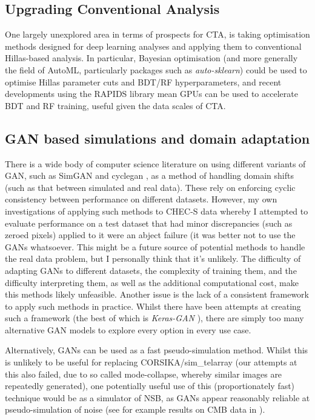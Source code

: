 \subsection{Upgrading Conventional Analysis}
One largely unexplored area in terms of prospects for CTA, is taking optimisation methods designed for deep learning analyses and applying them to conventional Hillas-based analysis. In particular, Bayesian optimisation (and more generally the field of AutoML, particularly packages such as \textit{auto-sklearn}\cite{autosklearn}) could be used to optimise Hillas parameter cuts and BDT/RF hyperparameters, and recent developments using the RAPIDS \cite{rapids} library mean GPUs can be used to accelerate BDT and RF training, useful given the data scales of CTA.


\subsection{GAN based simulations and domain adaptation}
There is a wide body of computer science literature on using different variants of GAN, such as SimGAN \cite{simgan} and cyclegan \cite{cyclegan}, as a method of handling domain shifts (such as that between simulated and real data). These rely on enforcing cyclic consistency between performance on different datasets. However, my own investigations of applying such methods to CHEC-S data whereby I attempted to evaluate performance on a test dataset that had minor discrepancies (such as zeroed pixels) applied to it were an abject failure (it was better not to use the GANs whatsoever. This might be a future source of potential methods to handle the real data problem, but I personally think that it's unlikely. The difficulty of adapting GANs to different datasets, the complexity of training them, and the difficulty interpreting them, as well as the additional computational cost, make this methods likely unfeasible. Another issue is the lack of a consistent framework to apply such methods in practice. Whilst there have been attempts at creating such a framework (the best of which is \textit{Keras-GAN} \cite{kerasgan}), there are simply too many alternative GAN models to explore every option in every use case. 

Alternatively, GANs can be used as a fast pseudo-simulation method. Whilst this is unlikely to be useful for replacing CORSIKA/sim\_telarray (our attempts at this also failed, due to so called mode-collapse, whereby similar images are repeatedly generated), one potentially useful use of this (proportionately fast) technique would be as a simulator of NSB, as GANs appear reasonably reliable at pseudo-simulation of noise (see for example results on CMB data in \cite{darshgan}). 


